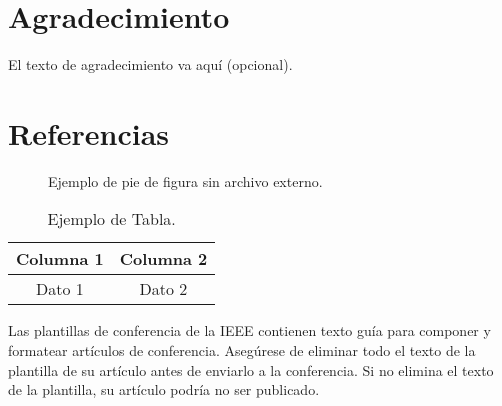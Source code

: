 \documentclass[conference]{IEEEtran}
\begin{document}
\section*{Agradecimiento}
El texto de agradecimiento va aquí (opcional).

\section*{Referencias}
\begin{thebibliography}{00}

\end{thebibliography}

\begin{figure}[htbp]
\centering
\fbox{\rule[0pt]{0pt}{50pt}\rule{0.4\textwidth}{0pt}} %
\caption{Ejemplo de pie de figura sin archivo externo.}
\label{fig}
\end{figure}

\begin{table}[htbp]
\caption{Ejemplo de Tabla.}
\begin{center}
\begin{tabular}{|c|c|}
\hline
\textbf{Columna 1}&\textbf{Columna 2} \\
\hline
Dato 1& Dato 2 \\
\hline
\end{tabular}
\label{tab1}
\end{center}
\end{table}

\vspace{12pt}
\color{red}
Las plantillas de conferencia de la IEEE contienen texto guía para componer y formatear artículos de conferencia. 
Asegúrese de eliminar todo el texto de la plantilla de su artículo antes de enviarlo a la conferencia. 
Si no elimina el texto de la plantilla, su artículo podría no ser publicado.
\end{document}
